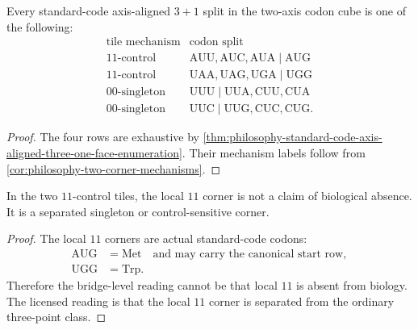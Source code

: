 \begin{theorem}
\label{thm:philosophy-total-local-tile-theorem}
Every standard-code axis-aligned $3+1$ split in the two-axis codon cube is
one of the following:
$$
\begin{array}{c|c}
  \text{tile mechanism} & \text{codon split}\\
\hline
  11\text{-control} &
    \mathrm{AUU},\mathrm{AUC},\mathrm{AUA}
      \;|\;\mathrm{AUG}\\
  11\text{-control} &
    \mathrm{UAA},\mathrm{UAG},\mathrm{UGA}
      \;|\;\mathrm{UGG}\\
  00\text{-singleton} &
    \mathrm{UUU}
      \;|\;\mathrm{UUA},\mathrm{CUU},\mathrm{CUA}\\
  00\text{-singleton} &
    \mathrm{UUC}
      \;|\;\mathrm{UUG},\mathrm{CUC},\mathrm{CUG}.
\end{array}
$$
\end{theorem}
\begin{proof}
The four rows are exhaustive by
\autoref{thm:philosophy-standard-code-axis-aligned-three-one-face-enumeration}.
Their mechanism labels follow from
\autoref{cor:philosophy-two-corner-mechanisms}.
\end{proof}

\begin{theorem}
\label{thm:philosophy-reserved-corner-interpretation}
In the two $11$-control tiles, the local $11$ corner is not a claim of
biological absence. It is a separated singleton or control-sensitive
corner.
\end{theorem}
\begin{proof}
The local $11$ corners are actual standard-code codons:
$$
\begin{aligned}
  \mathrm{AUG} &= \mathrm{Met}
    \quad\text{and may carry the canonical start row},\\
  \mathrm{UGG} &= \mathrm{Trp}.
\end{aligned}
$$
Therefore the bridge-level reading cannot be that local $11$ is absent
from biology. The licensed reading is that the local $11$ corner is
separated from the ordinary three-point class.
\end{proof}


